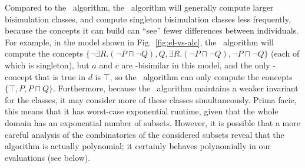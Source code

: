 Compared to the \alc\ algorithm, the \el\ algorithm will generally
compute larger bisimulation classes, and compute singleton
bisimulation classes less frequently, because the concepts it can
build can ``see'' fewer differences between individuals.  For example,
in the model shown in Fig.~\ref{fig:el-vs-alc}, the \alc\ algorithm
will compute the concepts $\{\neg \exists R. (\neg P \sqcap \neg Q),
Q, \exists R. (\neg P \sqcap \neg Q), \neg P \sqcap \neg Q\}$ (each of
which is singleton), but $a$ and $c$ are \el-bisimilar in this model,
and the only \el-concept that is true in $d$ is $\top$, so the \el\
algorithm can only compute the concepts $\{\top, P, P \sqcap Q\}$.
Furthermore, because the \el\ algorithm maintains a weaker invariant
for the classes, it may consider more of these classes simultaneously.
Prima facie, this means that it has worst-case exponential runtime,
given that the whole domain has an exponential number of subsets.
However, it is possible that a more careful analysis of the
combinatorics of the considered subsets reveal that the algorithm is
actually polynomial; it certainly behaves polynomially in our
evaluations (see below).



